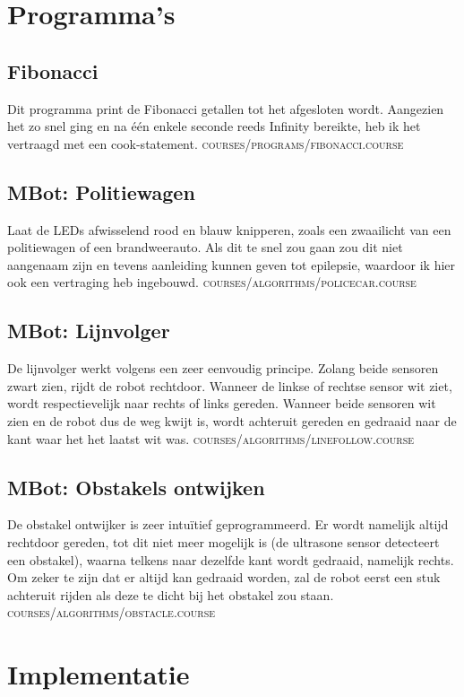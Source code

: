 \documentclass[12pt,a4paper]{report}
\begin{document}
\chapter{Programma's}

\section{Fibonacci}
Dit programma print de Fibonacci getallen tot het afgesloten wordt. Aangezien het zo snel ging en na één enkele seconde reeds Infinity bereikte, heb ik het vertraagd met een cook-statement. \textsc{courses/programs/fibonacci.course}

\section{MBot: Politiewagen}
Laat de LEDs afwisselend rood en blauw knipperen, zoals een zwaailicht van een politiewagen of een brandweerauto. Als dit te snel zou gaan zou dit niet aangenaam zijn en tevens aanleiding kunnen geven tot epilepsie, waardoor ik hier ook een vertraging heb ingebouwd. \textsc{courses/algorithms/policecar.course}

\section{MBot: Lijnvolger}
De lijnvolger werkt volgens een zeer eenvoudig principe. Zolang beide sensoren zwart zien, rijdt de robot rechtdoor. Wanneer de linkse of rechtse sensor wit ziet, wordt respectievelijk naar rechts of links gereden. Wanneer beide sensoren wit zien en de robot dus de weg kwijt is, wordt achteruit gereden en gedraaid naar de kant waar het het laatst wit was. \textsc{courses/algorithms/linefollow.course}

\section{MBot: Obstakels ontwijken}
De obstakel ontwijker is zeer intuïtief geprogrammeerd. Er wordt namelijk altijd rechtdoor gereden, tot dit niet meer mogelijk is (de ultrasone sensor detecteert een obstakel), waarna telkens naar dezelfde kant wordt gedraaid, namelijk rechts. Om zeker te zijn dat er altijd kan gedraaid worden, zal de robot eerst een stuk achteruit rijden als deze te dicht bij het obstakel zou staan. \textsc{courses/algorithms/obstacle.course}

\chapter{Implementatie}
\end{document}
